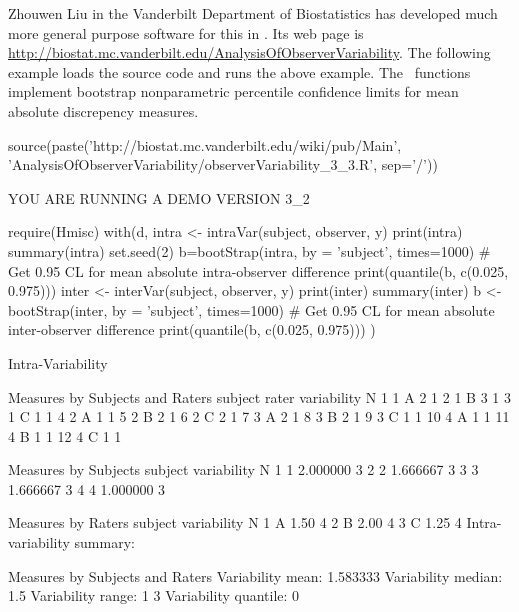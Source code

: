 Zhouwen Liu in the Vanderbilt Department of Biostatistics has
developed much more general purpose software for this in \R.  Its web
page is
\url{http://biostat.mc.vanderbilt.edu/AnalysisOfObserverVariability}.
The following example loads the source code and runs the above
example.  The \R\ functions implement bootstrap nonparametric
percentile confidence limits for mean absolute discrepency measures.
\begin{Schunk}
\begin{Sinput}
source(paste('http://biostat.mc.vanderbilt.edu/wiki/pub/Main',
             'AnalysisOfObserverVariability/observerVariability_3_3.R',
             sep='/'))
\end{Sinput}
\begin{Soutput}
YOU ARE RUNNING A DEMO VERSION 3_2 
\end{Soutput}
\begin{Sinput}
require(Hmisc)
with(d, {
  intra <- intraVar(subject, observer, y)
  print(intra)
  summary(intra)
  set.seed(2)
  b=bootStrap(intra, by = 'subject', times=1000)
  # Get 0.95 CL for mean absolute intra-observer difference
  print(quantile(b, c(0.025, 0.975)))
  inter <- interVar(subject, observer, y)
  print(inter)
  summary(inter)
  b <- bootStrap(inter, by = 'subject', times=1000)
  # Get 0.95 CL for mean absolute inter-observer difference
  print(quantile(b, c(0.025, 0.975)))
})
\end{Sinput}
\begin{Soutput}
Intra-Variability 

Measures by Subjects and Raters
   subject rater variability N
1        1     A           2 1
2        1     B           3 1
3        1     C           1 1
4        2     A           1 1
5        2     B           2 1
6        2     C           2 1
7        3     A           2 1
8        3     B           2 1
9        3     C           1 1
10       4     A           1 1
11       4     B           1 1
12       4     C           1 1

Measures by Subjects
  subject variability N
1       1    2.000000 3
2       2    1.666667 3
3       3    1.666667 3
4       4    1.000000 3

Measures by Raters
  subject variability N
1       A        1.50 4
2       B        2.00 4
3       C        1.25 4
Intra-variability summary:

Measures by Subjects and Raters
Variability mean:  1.583333 
Variability median:  1.5 
Variability range:  1 3 
Variability quantile: 
0%:  1   25%:  1   50%:  1.5   75%:  2   100%:  3 


\end{Soutput}
\end{Schunk}
